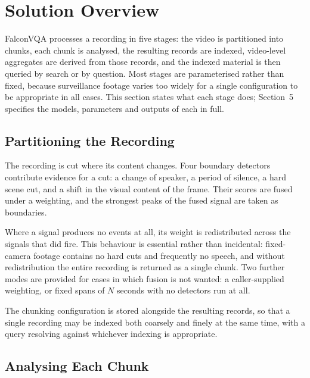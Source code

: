\section{Solution Overview}

FalconVQA processes a recording in five stages: the video is partitioned into chunks,
each chunk is analysed, the resulting records are indexed, video-level aggregates are
derived from those records, and the indexed material is then queried by search or by
question. Most stages are parameterised rather than fixed, because surveillance
footage varies too widely for a single configuration to be appropriate in all cases.
This section states what each stage does; Section~5 specifies the models, parameters and
outputs of each in full.


\subsection{Partitioning the Recording}

The recording is cut where its content changes. Four boundary detectors contribute
evidence for a cut: a change of speaker, a period of silence, a hard scene cut, and a
shift in the visual content of the frame. Their scores are fused under a weighting, and
the strongest peaks of the fused signal are taken as boundaries.

Where a signal produces no events at all, its weight is redistributed across the
signals that did fire. This behaviour is essential rather than incidental: fixed-camera
footage contains no hard cuts and frequently no speech, and without redistribution the
entire recording is returned as a single chunk. Two further modes are provided for
cases in which fusion is not wanted: a caller-supplied weighting, or fixed spans of
$N$ seconds with no detectors run at all.

The chunking configuration is stored alongside the resulting records, so that a single
recording may be indexed both coarsely and finely at the same time, with a query
resolving against whichever indexing is appropriate.

\subsection{Analysing Each Chunk}

